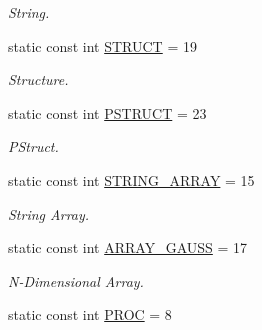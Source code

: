 \begin{DoxyCompactItemize}
\begin{DoxyCompactList}\small\item\em String. \end{DoxyCompactList}\item 
\hypertarget{struct_g_e_sym_type__s_a7abc9ab4e83c0b99f9fde37450489944}{static const int \hyperlink{struct_g_e_sym_type__s_a7abc9ab4e83c0b99f9fde37450489944}{S\-T\-R\-U\-C\-T} = 19}\label{struct_g_e_sym_type__s_a7abc9ab4e83c0b99f9fde37450489944}

\begin{DoxyCompactList}\small\item\em Structure. \end{DoxyCompactList}\item 
\hypertarget{struct_g_e_sym_type__s_a604a22cdce168927932ee303c2aa9c8c}{static const int \hyperlink{struct_g_e_sym_type__s_a604a22cdce168927932ee303c2aa9c8c}{P\-S\-T\-R\-U\-C\-T} = 23}\label{struct_g_e_sym_type__s_a604a22cdce168927932ee303c2aa9c8c}

\begin{DoxyCompactList}\small\item\em P\-Struct. \end{DoxyCompactList}\item 
\hypertarget{struct_g_e_sym_type__s_a8b841bad6dacbbacf0d423219bd08a98}{static const int \hyperlink{struct_g_e_sym_type__s_a8b841bad6dacbbacf0d423219bd08a98}{S\-T\-R\-I\-N\-G\-\_\-\-A\-R\-R\-A\-Y} = 15}\label{struct_g_e_sym_type__s_a8b841bad6dacbbacf0d423219bd08a98}

\begin{DoxyCompactList}\small\item\em String Array. \end{DoxyCompactList}\item 
\hypertarget{struct_g_e_sym_type__s_ae49660fdf27d7d165463abb2ccc941e4}{static const int \hyperlink{struct_g_e_sym_type__s_ae49660fdf27d7d165463abb2ccc941e4}{A\-R\-R\-A\-Y\-\_\-\-G\-A\-U\-S\-S} = 17}\label{struct_g_e_sym_type__s_ae49660fdf27d7d165463abb2ccc941e4}

\begin{DoxyCompactList}\small\item\em N-\/\-Dimensional Array. \end{DoxyCompactList}\item 
\hypertarget{struct_g_e_sym_type__s_a117901fdf3914c09101a90fe7867f111}{static const int \hyperlink{struct_g_e_sym_type__s_a117901fdf3914c09101a90fe7867f111}{P\-R\-O\-C} = 8}\label{struct_g_e_sym_type__s_a117901fdf3914c09101a90fe7867f111}


\end{DoxyCompactItemize}
